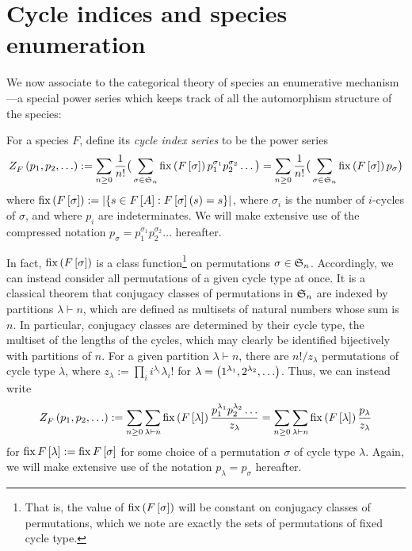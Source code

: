 \documentclass[sectionflow,singlespace,twoside,boldmathhdr,draft]{brandiss} %
\numberwithin{section}{chapter}
\numberwithin{figure}{chapter}
\begin{document}
\section{Cycle indices and species enumeration}\label{s:cycind}
We now associate to the categorical theory of species an enumerative mechanism---a special power series which keeps track of all the automorphism structure of the species:
\begin{definition}
  \label{def:cycind}
  For a species $F$, define its \emph{cycle index series} to be the power series
  \begin{equation}
    \label{eq:cycinddef}
     Z_{F}^{}  \left( {p_{1}, p_{2}, \dots} \right) := \sum_{n \geq 0} \frac{1}{n!} \big( \sum_{\sigma \in  \mathfrak{S}_{n} } \operatorname{fix} \left( {F \left[ {\sigma} \right]} \right) p_{1}^{\sigma_{1}} p_{2}^{\sigma_{2}} \dots \big) = \sum_{n \geq 0} \frac{1}{n!} \big( \sum_{\sigma \in  \mathfrak{S}_{n} } \operatorname{fix} \left( {F \left[ {\sigma} \right]} \right) p_{\sigma} \big)
  \end{equation}
  where $\operatorname{fix} \left( {F \left[ {\sigma} \right]} \right) := \left\vert {\ensuremath{\left\{ {s \in F \left[ {A} \right] : F \left[ {\sigma} \right] \left( {s} \right) = s} \right\}}} \right\vert$, where $\sigma_{i}$ is the number of $i$-cycles of $\sigma$, and where $p_{i}$ are indeterminates.
  We will make extensive use of the compressed notation $p_{\sigma} = p_{1}^{\sigma_{1}} p_{2}^{\sigma_{2}} \dots$ hereafter.
\end{definition}

In fact, $\operatorname{fix} \left( {F \left[ {\sigma} \right]} \right)$ is a class function\footnote{That is, the value of $\operatorname{fix} \left( {F \left[ {\sigma} \right]} \right)$ will be constant on conjugacy classes of permutations, which we note are exactly the sets of permutations of fixed cycle type.} on permutations $\sigma \in  \mathfrak{S}_{n} $.
Accordingly, we can instead consider all permutations of a given cycle type at once.
It is a classical theorem that conjugacy classes of permutations in $ \mathfrak{S}_{n} $ are indexed by partitions $\lambda \vdash n$, which are defined as multisets of natural numbers whose sum is $n$.
In particular, conjugacy classes are determined by their cycle type, the multiset of the lengths of the cycles, which may clearly be identified bijectively with partitions of $n$.
For a given partition $\lambda \vdash n$, there are $n! / z_{\lambda}$ permutations of cycle type $\lambda$, where $z_{\lambda} := \prod_{i} i^{\lambda_{i}} \lambda_{i}!$ for $\lambda = \left( {1^{\lambda_{1}}, 2^{\lambda_{2}}, \dots} \right)$.
Thus, we can instead write
\begin{equation}
  \label{eq:cycinddefpart}
   Z_{F}^{}  \left( {p_{1}, p_{2}, \dots} \right) := \sum_{n \geq 0} \sum_{\lambda \vdash n} \operatorname{fix} \left( {F \left[ {\lambda} \right]} \right) \frac{p_{1}^{\lambda_{1}} p_{2}^{\lambda_{2}} \dots}{z_{\lambda}} = \sum_{n \geq 0} \sum_{\lambda \vdash n} \operatorname{fix} \left( {F \left[ {\lambda} \right]} \right) \frac{p_{\lambda}}{z_{\lambda}}
\end{equation}
for $\operatorname{fix} F \left[ {\lambda} \right] := \operatorname{fix} F \left[ {\sigma} \right]$ for some choice of a permutation $\sigma$ of cycle type $\lambda$.
Again, we will make extensive use of the notation $p_{\lambda} = p_{\sigma}$ hereafter.
\end{document}
